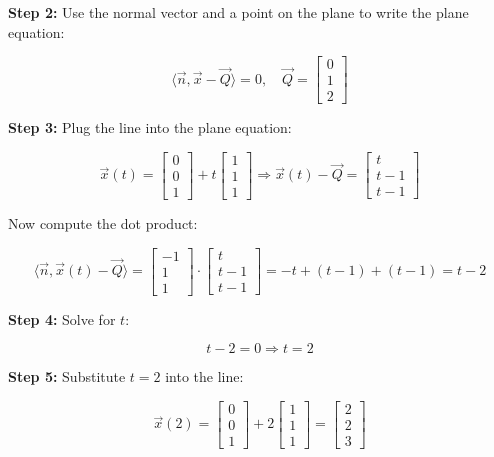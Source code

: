 \textbf{Step 2:} Use the normal vector and a point on the plane to write the plane equation:

\[
	\langle \vec{n}, \vec{x} - \vec{Q} \rangle = 0, \quad \vec{Q} = \begin{bmatrix} 0 \\ 1 \\ 2 \end{bmatrix}
\]

\textbf{Step 3:} Plug the line into the plane equation:

\[
	\vec{x}(t) = \begin{bmatrix} 0 \\ 0 \\ 1 \end{bmatrix} + t \begin{bmatrix} 1 \\ 1 \\ 1 \end{bmatrix}
	\Rightarrow
	\vec{x}(t) - \vec{Q} =
	\begin{bmatrix} t \\ t - 1 \\ t - 1 \end{bmatrix}
\]

Now compute the dot product:

\[
	\langle \vec{n}, \vec{x}(t) - \vec{Q} \rangle =
	\begin{bmatrix} -1 \\ 1 \\ 1 \end{bmatrix} \cdot \begin{bmatrix} t \\ t - 1 \\ t - 1 \end{bmatrix}
	= -t + (t - 1) + (t - 1) = t - 2
\]

\textbf{Step 4:} Solve for \(t\):

\[
	t - 2 = 0 \Rightarrow t = 2
\]

\textbf{Step 5:} Substitute \( t = 2 \) into the line:

\[
	\vec{x}(2) = \begin{bmatrix} 0 \\ 0 \\ 1 \end{bmatrix} + 2 \begin{bmatrix} 1 \\ 1 \\ 1 \end{bmatrix} =
	\begin{bmatrix} 2 \\ 2 \\ 3 \end{bmatrix}
\]

